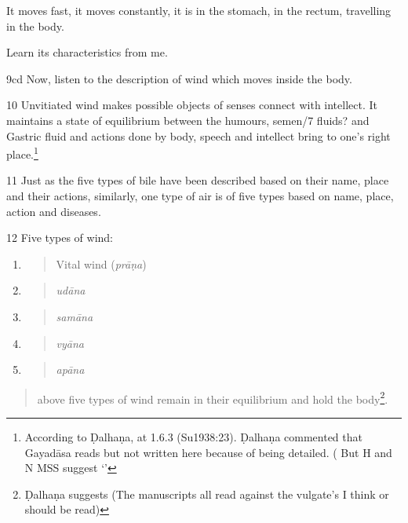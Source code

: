\begin{translation}
It moves fast, it moves constantly, it is in the stomach, in the rectum,
travelling in the body.  

Learn its characteristics from me.
     
     

\item[9cd] Now, listen to the description of wind which moves inside the
body.

\item[10] Unvitiated wind makes possible objects of senses connect with
intellect. It maintains a state of equilibrium between the humours,
semen/7 fluids? and Gastric fluid and actions done by body, speech and
intellect bring to one's right place.\footnote{ According to Ḍalhaṇa,
 at 1.6.3 (Su1938:23). Ḍalhaṇa commented that
Gayadāsa reads  but not written here
because of being detailed. ( But H and N MSS suggest  
`'}

\item[11] Just as the five types of bile have been described based 
on their
name, place and their actions, similarly, one type of air is of five
types based on name, place, action and diseases.

\item[12] Five types of wind:

\begin{enumerate}
\def\labelenumi{\arabic{enumi}.}
\item
\begin{quote}
Vital wind (\emph{prāṇa})
\end{quote}
\item
\begin{quote}
\emph{udāna }
\end{quote}
\item
\begin{quote}
\emph{samāna}
\end{quote}
\item
\begin{quote}
\emph{vyāna}
\end{quote}
\item
\begin{quote}
\emph{apāna}
\end{quote}
\end{enumerate}

\begin{quote}
above five types of wind remain in their equilibrium and hold the
body\footnote{ Ḍalhaṇa suggests 
(The manuscripts all read    against the vulgate's  I think  or  should be read)}.
\end{quote}


\end{translation}
